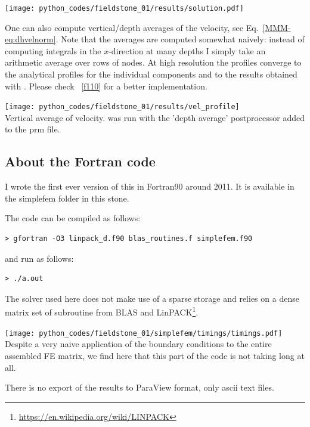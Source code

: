 \begin{center}
\texttt{[image: python\_codes/fieldstone\_01/results/solution.pdf]}
\end{center}

One can also compute vertical/depth averages of the velocity, see Eq.~\eqref{MMM-eq:dhvelnorm}.
Note that the averages are computed somewhat naively: instead of computing integrals in the $x$-direction
at many depths I simply take an arithmetic average over rows of nodes. At high resolution the profiles
converge to the analytical profiles for the individual components and to the results 
obtained with \aspect. Please check \stone~\ref{f110} for a better implementation.
\begin{center}
\texttt{[image: python\_codes/fieldstone\_01/results/vel\_profile]}\\
{\captionfont Vertical average of velocity. \aspect was run with the 'depth average' postprocessor
added to the prm file.}
\end{center}

\newpage
\subsection*{About the Fortran code}

I wrote the first ever version of this \stone in
Fortran90 around 2011. It is available in the {\foldernamefont simplefem} folder in this stone.

The code can be compiled as follows:
\begin{verbatim}
> gfortran -O3 linpack_d.f90 blas_routines.f simplefem.f90
\end{verbatim}
and run as follows:
\begin{verbatim}
> ./a.out 
\end{verbatim}
The solver used here does not make use of a sparse storage and relies on a dense matrix 
set of subroutine from BLAS and LinPACK\footnote{\url{https://en.wikipedia.org/wiki/LINPACK}}.
\begin{center}
\texttt{[image: python\_codes/fieldstone\_01/simplefem/timings/timings.pdf]}\\
{\captionfont Despite a very naive application of the boundary conditions to the entire
assembled FE matrix, we find here that this part of the code is not taking long at all.}
\end{center}
There is no export of the results to ParaView format, only ascii text files.



